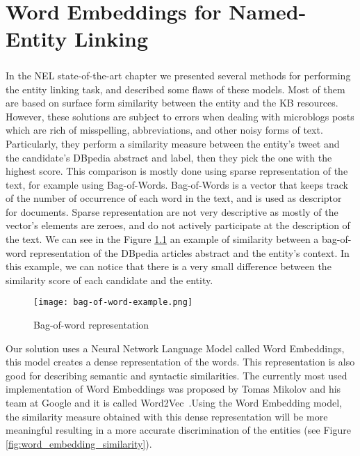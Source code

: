 \chapter{Word Embeddings for Named-Entity Linking}

\paragraph{}
In the NEL state-of-the-art chapter we presented several methods for performing the entity linking task, and described some flaws of these models. Most of them are based on surface form similarity between the entity and the KB resources. However, these solutions are subject to errors when dealing with microblogs posts which are rich of misspelling, abbreviations, and other noisy forms of text. Particularly, they perform a similarity measure between the entity's tweet and the candidate's DBpedia abstract and label, then they pick the one with the highest score. This comparison is mostly done using sparse representation of the text, for example using Bag-of-Words. Bag-of-Words is a vector that keeps track of the number of occurrence of each word in the text, and is used as descriptor for documents. Sparse representation are not very descriptive as mostly of the vector's elements are zeroes, and do not actively participate at the description of the text. We can see in the Figure \ref{fig:bag_word} an example of similarity between a bag-of-word representation of the DBpedia articles abstract and the entity's context. In this example, we can notice that there is a very small difference between the similarity score of each candidate and the entity.


\begin{figure}[h!]
\texttt{[image: bag-of-word-example.png]}
\caption{Bag-of-word representation}
\label{fig:bag_word}
\end{figure}


Our solution uses a Neural Network Language Model called Word Embeddings, this model creates a dense representation of the words. This representation is also good for describing semantic and syntactic similarities. The currently most used implementation of Word Embeddings was proposed by Tomas Mikolov and his team at Google and it is called Word2Vec~\cite{mikolov2013efficient}.Using the Word Embedding model, the similarity measure obtained with this dense representation will be more meaningful resulting in a more accurate discrimination of the entities (see Figure \ref{fig:word_embedding_similarity}).


